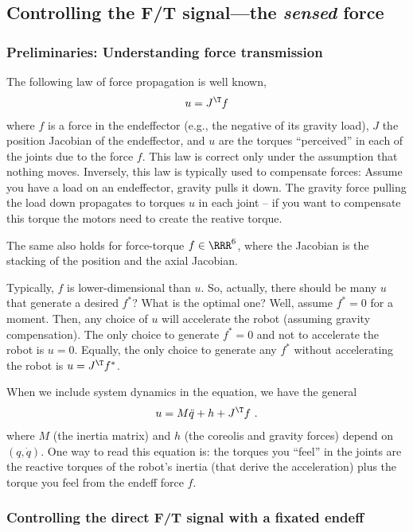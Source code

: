 \documentclass[10pt,fleqn,twoside]{article}
\begin{document}
{{\subsection{Controlling the F/T signal---the \emph{sensed} force}

\subsubsection{Preliminaries: Understanding force transmission}

The following law of force propagation is well known,
\begin{align}\label{eqForce}
u = J^\T f
\end{align}
where $f$ is a force in the endeffector (e.g., the negative
of its gravity load), $J$ the position Jacobian of the endeffector,
and $u$ are the torques ``perceived'' in each of the joints due to the
force $f$. This law is correct only under the assumption that nothing
moves. Inversely, this law is typically used to compensate forces:
Assume you have a load on an endeffector, gravity pulls it down. The
gravity force pulling the load down propagates to torques $u$ in each
joint -- if you want to compensate this torque the motors need to
create the reative torque.

The same also holds for force-torque $f\in\RRR^6$, where the Jacobian
is the stacking of the position and the axial Jacobian.

Typically, $f$ is lower-dimensional than $u$. So, actually, there
should be many $u$ that generate a desired $f^*$? What is the optimal
one? Well, assume $f^*=0$ for a moment. Then, any choice of $u$ will
accelerate the robot (assuming gravity compensation). The only choice
to generate $f^*=0$ and not to accelerate the robot is $u=0$. Equally,
the only choice to generate any $f^*$ without accelerating the robot
is $u = J^\T f^*$.

When we include system dynamics in the equation, we have the general
\begin{align}\label{eqDyn}
u = M \ddot q + h + J^\T f ~.
\end{align}
where $M$ (the inertia matrix) and $h$ (the coreolis and gravity
forces) depend on $(q,\dot q)$. One way to read this equation is: the
torques you ``feel'' in the joints are the reactive torques of the
robot's inertia (that derive the acceleration) plus the torque you
feel from the endeff force $f$.


\subsubsection{Controlling the direct F/T signal with a fixated endeff}

}}
\end{document}
